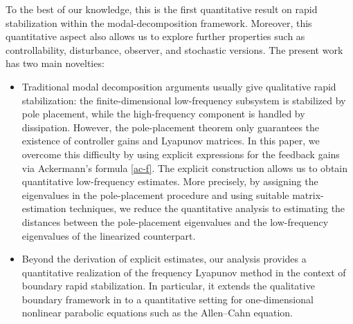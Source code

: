 \documentclass[a4paper]{article}
\numberwithin{equation}{section}
\begin{document}
To the best of our knowledge, this is the first quantitative result on rapid stabilization within the modal-decomposition framework. Moreover, this quantitative aspect also allows us to explore further properties such as controllability, disturbance, observer,  and stochastic versions. The present work has two main {novelties}:
\begin{itemize}
	\item[1.] Traditional modal decomposition arguments usually give qualitative rapid stabilization: the finite-dimensional low-frequency subsystem is stabilized by pole placement, while the high-frequency component is handled by dissipation. However, the pole-placement theorem only guarantees the existence of controller gains and Lyapunov matrices. In this paper, we overcome this difficulty by using explicit expressions for the feedback gains via Ackermann's formula \eqref{ac-f}. The explicit construction allows us to obtain quantitative low-frequency estimates. More precisely, by assigning the eigenvalues in the pole-placement procedure and using suitable matrix-estimation techniques, we reduce the quantitative analysis to estimating the distances between the pole-placement eigenvalues and the low-frequency eigenvalues of the linearized counterpart.
	
	\item[2.] Beyond the derivation of explicit estimates, our analysis provides a quantitative realization of the frequency Lyapunov method in the context of boundary rapid stabilization. In particular, it extends the qualitative boundary framework  in \cite{XZ} to a quantitative setting for one-dimensional nonlinear parabolic equations such as the Allen--Cahn equation.
\end{itemize}
\end{document}
